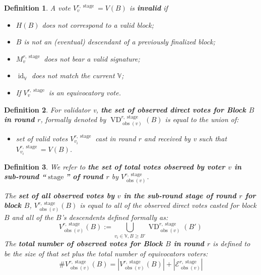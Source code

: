 \documentclass{article}
\newcommand{\assign}{:=}
\newcommand{\nosymbol}{}
\newcommand{\tmop}[1]{\ensuremath{\operatorname{#1}}}
\newcommand{\tmstrong}[1]{\textbf{#1}}
\newcommand{\tmtextbf}[1]{{\bfseries{#1}}}
\newenvironment{itemizedot}{\begin{itemize} \renewcommand{\labelitemi}{$\bullet$}\renewcommand{\labelitemii}{$\bullet$}\renewcommand{\labelitemiii}{$\bullet$}\renewcommand{\labelitemiv}{$\bullet$}}{\end{itemize}}
\newtheorem{definition}{Definition}
\providecommand{\nosymbol}{}
\providecommand{\tmop}[1]{\ensuremath{\mathrm{#1}}}
\providecommand{\tmstrong}[1]{\tmtextbf{#1}}
\providecommand{\tmtextbf}[1]{\tmtextbf{#1}}
\newtheorem{definition}{Definition}
\begin{document}
\begin{definition}
  A vote $V_v^{r, \tmop{stage}} = V (B)$ is {\tmstrong{invalid}} if
  \begin{itemize}
    \begin{itemizedot}
      \item $H (B)$ does not correspond to a valid block;
      
      \item $B$ is not an (eventual) descendant of a previously finalized
      block;
      
      \item $M^{r, \tmop{stage}}_v$ does not bear a valid signature;
      
      \item $\tmop{id}_{\mathbb{V}}$ does not match the current $\mathbb{V}$;
      
      \item If $V_v^{r, \tmop{stage}}$ is an equivocatory vote.
    \end{itemizedot}
  \end{itemize}
\end{definition}

\begin{definition}
  For validator v, {\tmstrong{the set of observed direct votes for Block $B$
  in round $r$}}, formally denoted by $\tmop{VD}^{r, \tmop{stage}}_{\tmop{obs}
  (v)}^{\nosymbol}_{\nosymbol} (B)$ is equal to the union of:
  \begin{itemizedot}
    \item set of valid votes $V^{r, \tmop{stage}}_{v_i}$ cast in round $r$ and
    received by v such that $V^{r, \tmop{stage}}_{v_i} = V (B)$.
  \end{itemizedot}
\end{definition}

\begin{definition}
  We refer to {\tmstrong{the set of total votes observed by voter $v$ in
  sub-round ``$\tmop{stage}$'' of round $r$}} by {\tmstrong{$V^{r,
  \tmop{stage}}_{\tmop{obs} (v)}^{\nosymbol}_{\nosymbol}$}}.
  
  The {\tmstrong{set of all observed votes by $v$ in the sub-round stage of
  round $r$ for block $B$}}, {\tmstrong{$V^{r, \tmop{stage}}_{\tmop{obs} (v)}
  (B)$}} is equal to all of the observed direct votes casted for block $B$ and
  all of the $B$'s descendents defined formally as:
  \[ V^{r, \tmop{stage}}_{\tmop{obs} (v)} (B) \assign \bigcup_{v_i \in
     \mathbb{V}, B \geqslant B'} \tmop{VD}^{r, \tmop{stage}}_{\tmop{obs} (v)}
     (B')_{\nosymbol}^{\nosymbol}_{\nosymbol} \]
  The {\tmstrong{total number of observed votes for Block $B$ in round $r$}}
  is defined to be the size of that set plus the total number of equivocators
  voters:
  \[ \#V^{r, \tmop{stage}}_{\tmop{obs} (v)} (B) = |V^{r,
     \tmop{stage}}_{\tmop{obs} (v)} (B) | + | \mathcal{E}^{r,
     \tmop{stage}}_{\tmop{obs} (v)} | \]
\end{definition}
\end{document}
